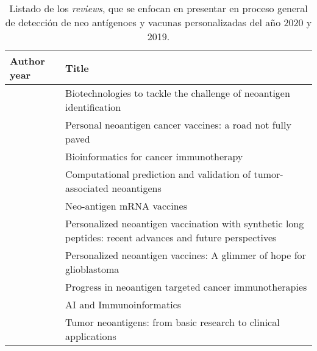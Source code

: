 \begin{table}[H]
	\caption{Listado de los \textit{reviews}, que se enfocan en presentar en proceso general de detección de neo antígenoes y vacunas personalizadas del año 2020 y 2019.}
	\label{tab:review_2021_2019}
	\begin{tabular}{p{3cm}p{10cm}}
		\textbf{Author year}                                    & \textbf{Title}                                                                                                                            \\ \hline	
		\cite{arnaud2020biotechnologies}      & Biotechnologies to tackle the challenge of neoantigen identification                                                                      \\
		\cite{fritsch2020personal}            & Personal neoantigen cancer vaccines: a road not fully paved                                                                               \\
		\cite{holtstrater2020bioinformatics}  & Bioinformatics for cancer immunotherapy                                                                                                   \\
		\cite{roudko2020computational}        & Computational prediction and validation of tumor-associated neoantigens                                                                   \\
		\cite{esprit2020neo}                  & Neo-antigen mRNA vaccines                                                                                                                 \\
		\cite{chen2020personalized}           & Personalized neoantigen vaccination with synthetic long peptides: recent advances and future perspectives                                 \\
		\cite{londhe2020personalized}         & Personalized neoantigen vaccines: A glimmer of hope for glioblastoma                                                                      \\
		\cite{han2020progress}                & Progress in neoantigen targeted cancer immunotherapies                                                                                    \\
		\cite{keshavarzi2020ai}               & AI and Immunoinformatics                                                                                                                  \\
		\cite{jiang2019tumor}                 & Tumor neoantigens: from basic research to clinical applications                                                                           \\

\end{tabular}
\end{table}
